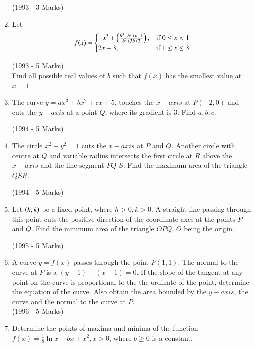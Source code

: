 \documentclass[journal,12pt,twocolumn]{IEEEtran}
\theoremstyle{remark}
\begin{document}
\begin{enumerate}
\hfill {(1993 - 3 Marks)}\\


\item Let 
\[ f(x) = \begin{cases}
-x^3 + \left(\frac{b^3-b^2+b-1}{b^2+3b+2}\right), & \text{if } 0\leq x < 1\\
2x-3, & \text{if } 1\leq x \leq 3
\end{cases}
\]

\hfill {(1993 - 5 Marks)}\\

Find all possible real values of $b$ such that $f(x)$ has the smallest value at $x=1$.

\item The curve $y = ax^3 + bx^2 + cx + 5$, touches the $x-axis$ at $P(-2,0)$ and cuts the $y-axis$ at a point $Q$, where its gradient is 3. Find $a, b, c$.

\hfill {(1994 - 5 Marks)}\\

\item The circle $x^2 + y^2 = 1$ cuts the $x-axis$ at $P$ and $Q$. Another circle with centre at $Q$ and variable radius intersects the first circle at $R$ above the $x-axis$ and the line segment $PQ$ $S$. Find the maximum area of the triangle $QSR$.

\hfill {(1994 - 5 Marks)}\\


\item Let $\left(h,k\right)$ be a fixed point, where $h>0, k>0$. A straight line passing through this point cuts the positive direction of the coordinate axes at the points $P$ and $Q$. Find the minimum area of the triangle $OPQ$, $O$ being the origin.

\hfill {(1995 - 5 Marks)}\\


\item A curve $y=f(x)$ passes through the point $P(1,1)$. The normal to the curve at $P$ is a $(y-1) + (x-1) = 0$. If the slope of the tangent at any point on the curve is proportional to the the ordinate of the point, determine the equation of the curve. Also obtain the area bounded by the $y-axis$, the curve and the normal to the curve at $P$.\\
\hfill {(1996 - 5 Marks)}\\

\item Determine the points of maxima and minima of the function $f(x) = \frac{1}{8}\ln{x} - bx + x^2, x>0$, where $b \geq 0$ is a constant.


\end{enumerate}
\end{document}
